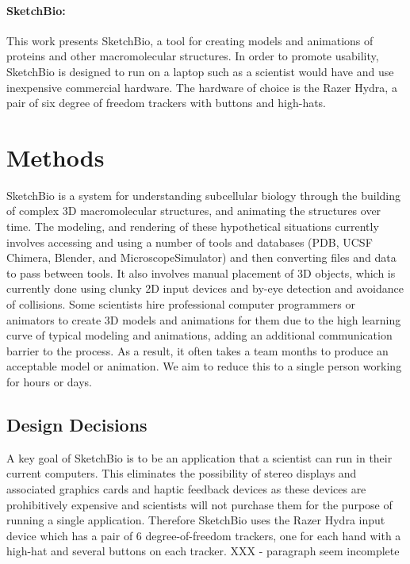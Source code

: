 \documentclass[twocolumn]{bmcart}%
\begin{document}
\paragraph*{SketchBio:}
This work presents SketchBio, a tool for creating models and animations of proteins and other macromolecular structures.  In order to promote usability, SketchBio is designed to run on a laptop such as a scientist would have and use inexpensive commercial hardware.  The hardware of choice is the Razer Hydra, a pair of six degree of freedom trackers with buttons and high-hats.

\section*{Methods}

SketchBio is a system for understanding subcellular biology through the building of complex 3D macromolecular structures, and animating the structures over time.   The modeling, and rendering of these hypothetical situations currently involves accessing and using a number of tools and databases (PDB, UCSF Chimera, Blender, and MicroscopeSimulator) and then converting files and data to pass between tools.  It also involves manual placement of 3D objects, which is currently done using clunky 2D input devices and by-eye detection and avoidance of collisions.  Some scientists hire professional computer programmers or animators to create 3D models and animations for them due to the high learning curve of typical modeling and animations, adding an additional communication barrier to the process.  As a result, it often takes a team months to produce an acceptable model or animation.  We aim to reduce this to a single person working for hours or days.

\subsection*{Design Decisions}
A key goal of SketchBio is to be an application that a scientist can run in their current computers.  This eliminates the possibility of stereo displays and associated graphics cards and haptic feedback devices as these devices are prohibitively expensive and scientists will not purchase them for the purpose of running a single application.  Therefore SketchBio uses the Razer Hydra input device which has a pair of 6 degree-of-freedom trackers, one for each hand with a high-hat and several buttons on each tracker.  XXX - paragraph seem incomplete
\end{document}
